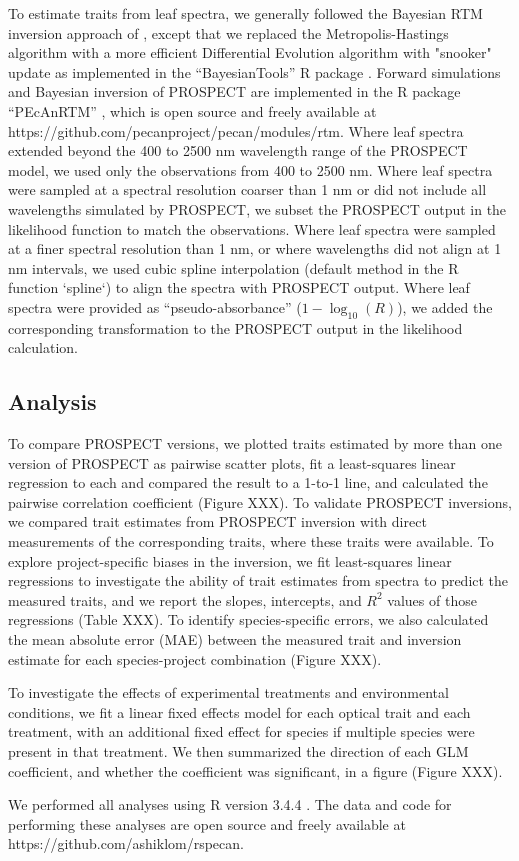 To estimate traits from leaf spectra, we generally followed the Bayesian RTM inversion approach of \cite{shiklomanov2016_rse}, except that we replaced the Metropolis-Hastings algorithm with a more efficient Differential Evolution algorithm with "snooker" update as implemented in the ``BayesianTools'' R package \cite{bayesiantools}.
Forward simulations and Bayesian inversion of PROSPECT are implemented in the R package ``PEcAnRTM'' \cite{shiklomanov2016_rse}, which is open source and freely available at https://github.com/pecanproject/pecan/modules/rtm.
Where leaf spectra extended beyond the 400 to 2500 nm wavelength range of the PROSPECT model, we used only the observations from 400 to 2500 nm.
Where leaf spectra were sampled at a spectral resolution coarser than 1 nm or did not include all wavelengths simulated by PROSPECT, we subset the PROSPECT output in the likelihood function to match the observations.
Where leaf spectra were sampled at a finer spectral resolution than 1 nm, or where wavelengths did not align at 1 nm intervals, we used cubic spline interpolation (default method in the R function `spline`) to align the spectra with PROSPECT output.
Where leaf spectra were provided as ``pseudo-absorbance'' ($1 - \log_{10}(R)$), we added the corresponding transformation to the PROSPECT output in the likelihood calculation. 

\subsection{Analysis}

To compare PROSPECT versions, we plotted traits estimated by more than one version of PROSPECT as pairwise scatter plots, fit a least-squares linear regression to each and compared the result to a 1-to-1 line, and calculated the pairwise correlation coefficient (Figure XXX).
To validate PROSPECT inversions, we compared trait estimates from PROSPECT inversion with direct measurements of the corresponding traits, where these traits were available.
To explore project-specific biases in the inversion, we fit least-squares linear regressions to investigate the ability of trait estimates from spectra to predict the measured traits, and we report the slopes, intercepts, and $R^2$ values of those regressions (Table XXX).
To identify species-specific errors, we also calculated the mean absolute error (MAE) between the measured trait and inversion estimate for each species-project combination (Figure XXX).

To investigate the effects of experimental treatments and environmental conditions, we fit a linear fixed effects model for each optical trait and each treatment, with an additional fixed effect for species if multiple species were present in that treatment.
We then summarized the direction of each GLM coefficient, and whether the coefficient was significant, in a figure (Figure XXX).


We performed all analyses using R version 3.4.4 \cite{rstats}.
The data and code for performing these analyses are open source and freely available at https://github.com/ashiklom/rspecan.
